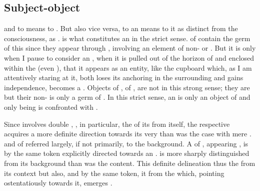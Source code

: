 \subsection{Subject-object}\label{sub:subobj}
\pa {} and to  means to
. But also vice versa, to  an  means to
 it as distinct from the  consciousness, as .
 is what constitutes an  in the strict sense.
 of  contain the germ of this 
since they appear through , involving an element of non-
or . But it is only when I pause to  consider
an , when it is pulled out of the horizon of  and
enclosed within the \hoa (even ), that it appears as an
 entity, like the cupboard which, as I am 
attentively staring at it, both loses its anchoring in the surrounding 
and gains independence, becomes a . Objects of
, of , are not  in this strong sense;
they are  but their non- is only a germ of
.  In this strict sense, an  is only an object of
 and only  being is confronted with .

Since  involves double ,
, in particular, the  of its 
from itself, the respective  acquires a more definite
direction towards its very  than was the case with mere .
 and  of  referred largely, if not
primarily, to the background.  A  of , appearing , is by the same token explicitly directed towards an 
.   is more sharply distinguished from its background than
was the  content. This definite delineation  thus
the  from its context but also, and by the same token,
 it from the  which, pointing ostentatiously towards
it, emerges .

